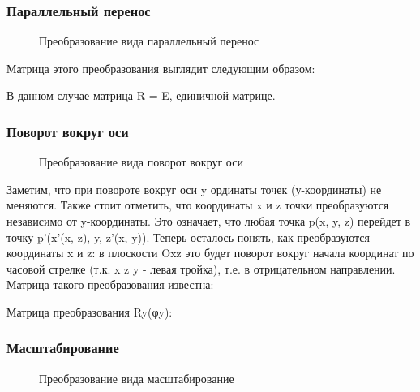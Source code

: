 \subsubsection{Параллельный перенос}
\begin{figure}[H]
	\caption{Преобразование вида параллельный перенос}
	\label{prim1:image}
\end{figure}

Матрица этого преобразования выглядит следующим образом:

\begin{figure}[H]
\end{figure}

В данном случае матрица R = E, единичной матрице.

\subsubsection{Поворот вокруг оси}
\begin{figure}[H]
	\caption{Преобразование вида поворот вокруг оси}
	\label{prim2:image}
\end{figure}

Заметим, что при повороте вокруг оси y ординаты точек (у-координаты) не меняются. Также стоит отметить, что координаты x и z точки преобразуются независимо от y-координаты. Это означает, что любая точка p(x, y, z) перейдет в точку p’(x’(x, z), y, z’(x, y)). Теперь осталось понять, как преобразуются координаты x и z: в плоскости Oxz это будет поворот вокруг начала координат по часовой стрелке (т.к. x z y - левая тройка), т.е. в отрицательном направлении. Матрица такого преобразования известна:
\begin{figure}[H]
\end{figure}

\vspace*{5mm}Матрица преобразования Ry(φy):

\begin{figure}[H]
\end{figure}

\subsubsection{Масштабирование}
\begin{figure}[H]
	\caption{Преобразование вида масштабирование}
	\label{prim3:image}
\end{figure}

